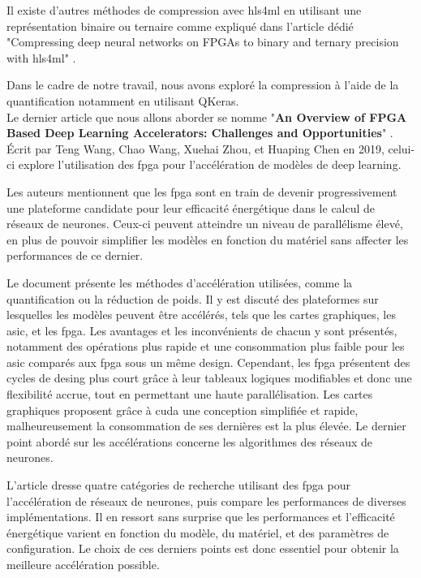 Il existe d'autres méthodes de compression avec \acrshort{hls4ml} en utilisant une représentation binaire ou ternaire comme expliqué dans l'article dédié "Compressing deep neural networks on FPGAs to binary and ternary precision with hls4ml" \cite{ngadiuba_compressing_2020}.

Dans le cadre de notre travail, nous avons exploré la compression à l'aide de la quantification notamment en utilisant QKeras.\\

Le dernier article que nous allons aborder se nomme "\textbf{An Overview of FPGA Based Deep Learning Accelerators: Challenges and Opportunities}" \cite{wang_overview_2019}. Écrit par Teng Wang, Chao Wang, Xuehai Zhou, et Huaping Chen en 2019, celui-ci explore l'utilisation des \acrshort{fpga} pour l'accélération de modèles de deep learning.

Les auteurs mentionnent que les \acrshort{fpga} sont en train de devenir progressivement une plateforme candidate pour leur efficacité énergétique dans le calcul de réseaux de neurones. Ceux-ci peuvent atteindre un niveau de parallélisme élevé, en plus de pouvoir simplifier les modèles en fonction du matériel sans affecter les performances de ce dernier.

Le document présente les méthodes d'accélération utilisées, comme la quantification ou la réduction de poids. Il y est discuté des plateformes sur lesquelles les modèles peuvent être accélérés, tels que les cartes graphiques, les \acrfull{asic}, et les \acrshort{fpga}. Les avantages et les inconvénients de chacun y sont présentés, notamment des opérations plus rapide et une consommation plus faible pour les \acrshort{asic} comparés aux \acrshort{fpga} sous un même design. Cependant, les \acrshort{fpga} présentent des cycles de desing plus court grâce à leur tableaux logiques modifiables et donc une flexibilité accrue, tout en permettant une haute parallélisation. Les cartes graphiques proposent grâce à \acrfull{cuda} une conception simplifiée et rapide, malheureusement la consommation de ses dernières est la plus élevée. Le dernier point abordé sur les accélérations concerne les algorithmes des réseaux de neurones.

L'article dresse quatre catégories de recherche utilisant des \acrshort{fpga} pour l'accélération de réseaux de neurones, puis compare les performances de diverses implémentations. Il en ressort sans surprise que les performances et l'efficacité énergétique varient en fonction du modèle, du matériel, et des paramètres de configuration. Le choix de ces derniers points est donc essentiel pour obtenir la meilleure accélération possible.


